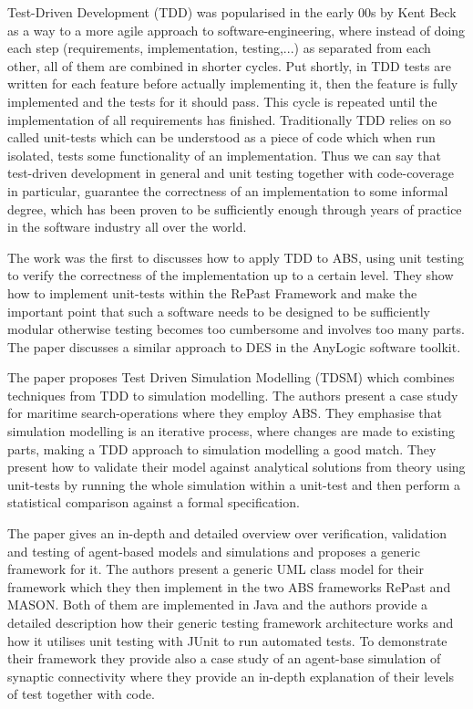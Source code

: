 Test-Driven Development (TDD) was popularised in the early 00s by Kent Beck \cite{beck_test_2002} as a way to a more agile approach to software-engineering, where instead of doing each step (requirements, implementation, testing,...) as separated from each other, all of them are combined in shorter cycles. Put shortly, in TDD tests are written for each feature before actually implementing it, then the feature is fully implemented and the tests for it should pass. This cycle is repeated until the implementation of all requirements has finished. Traditionally TDD relies on so called unit-tests which can be understood as a piece of code which when run isolated, tests some functionality of an implementation. Thus we can say that test-driven development in general and unit testing together with code-coverage in particular, guarantee the correctness of an implementation to some informal degree, which has been proven to be sufficiently enough through years of practice in the software industry all over the world. 

\medskip

The work \cite{collier_test-driven_2013} was the first to discusses how to apply TDD to ABS, using unit testing to verify the correctness of the implementation up to a certain level. They show how to implement unit-tests within the RePast Framework \cite{north_complex_2013} and make the important point that such a software needs to be designed to be sufficiently modular otherwise testing becomes too cumbersome and involves too many parts. The paper \cite{asta_investigation_2014} discusses a similar approach to DES in the AnyLogic software toolkit. 

The paper \cite{onggo_test-driven_2016} proposes Test Driven Simulation Modelling (TDSM) which combines techniques from TDD to simulation modelling. The authors present a case study for maritime search-operations where they employ ABS. They emphasise that simulation modelling is an iterative process, where changes are made to existing parts, making a TDD approach to simulation modelling a good match. They present how to validate their model against analytical solutions from theory using unit-tests by running the whole simulation within a unit-test and then perform a statistical comparison against a formal specification. %

The paper \cite{gurcan_generic_2013} gives an in-depth and detailed overview over verification, validation and testing of agent-based models and simulations and proposes a generic framework for it. The authors present a generic UML class model for their framework which they then implement in the two ABS frameworks RePast and MASON. Both of them are implemented in Java and the authors provide a detailed description how their generic testing framework architecture works and how it utilises unit testing with JUnit to run automated tests. To demonstrate their framework they provide also a case study of an agent-base simulation of synaptic connectivity where they provide an in-depth explanation of their levels of test together with code.

